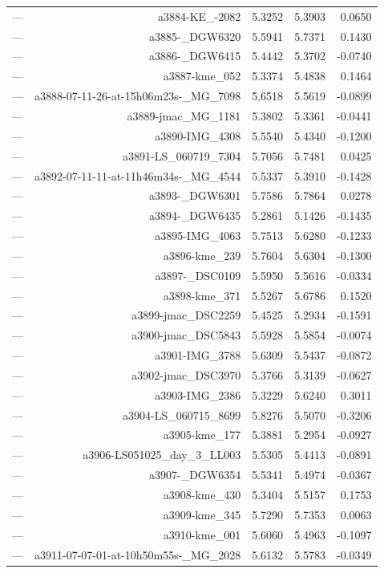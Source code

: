 \begin{table}[htbp]
\begin{tabular}{lrrrr}
— & a3884-KE_-2082 & 5.3252 & 5.3903 & 0.0650 \\
— & a3885-_DGW6320 & 5.5941 & 5.7371 & 0.1430 \\
— & a3886-_DGW6415 & 5.4442 & 5.3702 & -0.0740 \\
— & a3887-kme_052 & 5.3374 & 5.4838 & 0.1464 \\
— & a3888-07-11-26-at-15h06m23s-_MG_7098 & 5.6518 & 5.5619 & -0.0899 \\
— & a3889-jmac_MG_1181 & 5.3802 & 5.3361 & -0.0441 \\
— & a3890-IMG_4308 & 5.5540 & 5.4340 & -0.1200 \\
— & a3891-LS_060719_7304 & 5.7056 & 5.7481 & 0.0425 \\
— & a3892-07-11-11-at-11h46m34s-_MG_4544 & 5.5337 & 5.3910 & -0.1428 \\
— & a3893-_DGW6301 & 5.7586 & 5.7864 & 0.0278 \\
— & a3894-_DGW6435 & 5.2861 & 5.1426 & -0.1435 \\
— & a3895-IMG_4063 & 5.7513 & 5.6280 & -0.1233 \\
— & a3896-kme_239 & 5.7604 & 5.6304 & -0.1300 \\
— & a3897-_DSC0109 & 5.5950 & 5.5616 & -0.0334 \\
— & a3898-kme_371 & 5.5267 & 5.6786 & 0.1520 \\
— & a3899-jmac_DSC2259 & 5.4525 & 5.2934 & -0.1591 \\
— & a3900-jmac_DSC5843 & 5.5928 & 5.5854 & -0.0074 \\
— & a3901-IMG_3788 & 5.6309 & 5.5437 & -0.0872 \\
— & a3902-jmac_DSC3970 & 5.3766 & 5.3139 & -0.0627 \\
— & a3903-IMG_2386 & 5.3229 & 5.6240 & 0.3011 \\
— & a3904-LS_060715_8699 & 5.8276 & 5.5070 & -0.3206 \\
— & a3905-kme_177 & 5.3881 & 5.2954 & -0.0927 \\
— & a3906-LS051025_day_3_LL003 & 5.5305 & 5.4413 & -0.0891 \\
— & a3907-_DGW6354 & 5.5341 & 5.4974 & -0.0367 \\
— & a3908-kme_430 & 5.3404 & 5.5157 & 0.1753 \\
— & a3909-kme_345 & 5.7290 & 5.7353 & 0.0063 \\
— & a3910-kme_001 & 5.6060 & 5.4963 & -0.1097 \\
— & a3911-07-07-01-at-10h50m55s-_MG_2028 & 5.6132 & 5.5783 & -0.0349 \\

\end{tabular}
\end{table}

